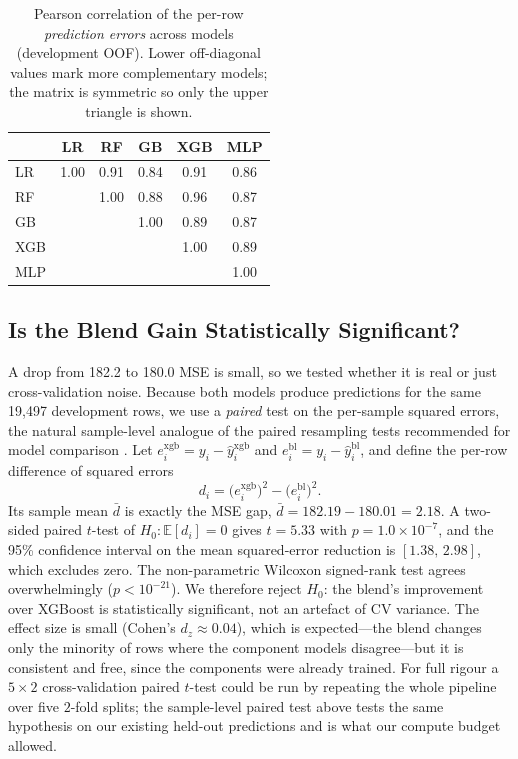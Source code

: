 \documentclass[journal]{IEEEtran}
\begin{document}
\begin{table}[!t]
\caption{Pearson correlation of the per-row \emph{prediction errors} across
models (development OOF). Lower off-diagonal values mark more complementary
models; the matrix is symmetric so only the upper triangle is shown.}
\label{tab:errcorr}
\centering
\begin{tabular}{lccccc}
\toprule
 & LR & RF & GB & XGB & MLP \\
\midrule
LR  & 1.00 & 0.91 & 0.84 & 0.91 & 0.86 \\
RF  &      & 1.00 & 0.88 & 0.96 & 0.87 \\
GB  &      &      & 1.00 & 0.89 & 0.87 \\
XGB &      &      &      & 1.00 & 0.89 \\
MLP &      &      &      &      & 1.00 \\
\bottomrule
\end{tabular}
\end{table}

\subsection{Is the Blend Gain Statistically Significant?}
\label{sec:significance}
A drop from 182.2 to 180.0 MSE is small, so we tested whether it is real or just
cross-validation noise. Because both models produce predictions for the same
19{,}497 development rows, we use a \emph{paired} test on the per-sample squared
errors, the natural sample-level analogue of the paired resampling tests
recommended for model comparison \cite{dietterich1998}. Let
$e_i^{\text{xgb}}=y_i-\hat y_i^{\text{xgb}}$ and
$e_i^{\text{bl}}=y_i-\hat y_i^{\text{bl}}$, and define the per-row difference of
squared errors
\begin{equation}
d_i=\big(e_i^{\text{xgb}}\big)^{2}-\big(e_i^{\text{bl}}\big)^{2}.
\label{eq:diff}
\end{equation}
Its sample mean $\bar d$ is exactly the MSE gap, $\bar d = 182.19-180.01=2.18$.
A two-sided paired $t$-test of $H_0:\mathbb{E}[d_i]=0$ gives $t=5.33$ with
$p=1.0\times10^{-7}$, and the 95\% confidence interval on the mean squared-error
reduction is $[1.38,\,2.98]$, which excludes zero. The non-parametric Wilcoxon
signed-rank test agrees overwhelmingly ($p<10^{-21}$). We therefore reject $H_0$:
the blend's improvement over XGBoost is statistically significant, not an
artefact of CV variance. The effect size is small (Cohen's $d_z\approx0.04$),
which is expected---the blend changes only the minority of rows where the
component models disagree---but it is consistent and free, since the components
were already trained. For full rigour a $5\times2$ cross-validation paired
$t$-test \cite{dietterich1998} could be run by repeating the whole pipeline over
five $2$-fold splits; the sample-level paired test above tests the same
hypothesis on our existing held-out predictions and is what our compute budget
allowed.
\end{document}
